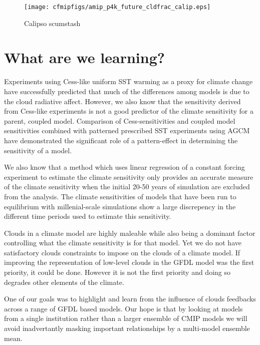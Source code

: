 \documentclass[11pt]{article}   	%
\begin{document}
\begin{figure}
  \texttt{[image: cfmipfigs/amip\_p4k\_future\_cldfrac\_calip.eps]}
  \caption{Calipso scumstash}
  \label{fig:calipso_amip_comparison}
\end{figure}

\section{What are we learning?}

Experiments using Cess-like uniform SST warming as a proxy for climate change have successfully predicted that much of the differences 
among models is due to the cloud radiative affect.  However, we also know that the sensitivity derived from Cess-like experiments is not
a good predictor of the climate sensitivity for a parent, coupled model.  Comparison of Cess-sensitivities and coupled model sensitivities 
combined with patterned prescribed SST experiments using AGCM have demonstrated the significant role of a pattern-effect in determining 
the sensitivity of a model.  

We also know that a method which uses linear regression of a constant forcing experiment to estimate the climate sensitivity only 
provides an accurate measure of the climate sensitivity when the initial 20-50 years of simulation are excluded from the analysis.  
The climate sensitivities of models that have been run to equilibrium with millenial-scale simulations show a large discrepency in the
different time periods used to estimate this sensitivity.  

Clouds in a climate model are highly maleable while also being a dominant factor controlling what the climate sensitivity is for that model.  
Yet we do not have satisfactory clouds constraints to impose on the clouds of a climate model.  If improving the representation of low-level
clouds in the GFDL model was the first priority, it could be done.  However it is not the first priority and doing so degrades other elements of 
the climate.  

One of our goals was to highlight and learn from the influence of clouds feedbacks across a range of GFDL based models.  Our hope 
is that by looking at models from a single institution rather than a larger ensemble of CMIP models we will avoid inadvertantly 
masking important relationships by a multi-model ensemble mean.  
\end{document}
